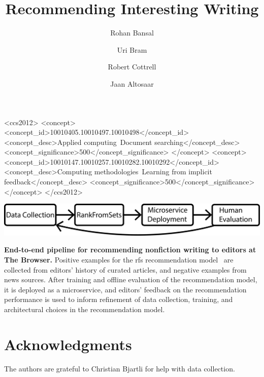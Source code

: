 \documentclass[sigconf]{acmart} %
\title{Recommending Interesting Writing}
\author{Rohan Bansal}
\affiliation{\institution{The Browser}}
\author{Uri Bram}
\affiliation{\institution{The Browser}}
\author{Robert Cottrell}
\affiliation{\institution{The Browser}}
\author{Jaan Altosaar}
\affiliation{\institution{Princeton University}}
\begin{document}

\begin{CCSXML}
<ccs2012>
   <concept>
       <concept_id>10010405.10010497.10010498</concept_id>
       <concept_desc>Applied computing~Document searching</concept_desc>
       <concept_significance>500</concept_significance>
       </concept>
   <concept>
       <concept_id>10010147.10010257.10010282.10010292</concept_id>
       <concept_desc>Computing methodologies~Learning from implicit feedback</concept_desc>
       <concept_significance>500</concept_significance>
       </concept>
 </ccs2012>
\end{CCSXML}



\begin{teaserfigure}
  \includegraphics[width=\textwidth]{fig/pipeline.pdf}
  \caption{\textbf{End-to-end pipeline for recommending nonfiction writing to editors at The Browser.} Positive examples for the \acrlong{rfs} recommendation model~\citep{altosaar2020rankfromsets:} are collected from editors' history of curated articles, and negative examples from news sources. After training and offline evaluation of the recommendation model, it is deployed as a microservice, and editors' feedback on the recommendation performance is used to inform refinement of data collection, training, and architectural choices in the recommendation model.}
  \label{fig:pipeline}
\end{teaserfigure}

\maketitle

% 



\section*{Acknowledgments}
The authors are grateful to Christian Bjartli for help with data collection.


\end{document}
